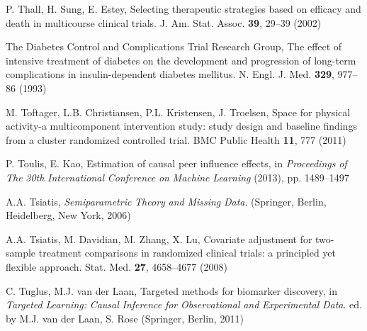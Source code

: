 \begin{list}{}{\setlength{\leftmargin}{2.1em}\setlength{\labelwidth}{0pt}
  \setlength{\labelsep}{0pt}\setlength{\itemindent}{-2.1em}
  \setlength{\parsep}{0pt}\setlength{\itemsep}{2pt}\setlength{\topsep}{0pt}}
\item\label{refentry:REF400}P. Thall, H. Sung, E. Estey, Selecting therapeutic strategies based on efficacy and death in multicourse clinical trials. J. Am. Stat. Assoc. \textbf{39}, 29--39 (2002)\label{refend:REF400}
\item\label{refentry:REF401}The Diabetes Control and Complications Trial Research Group, The effect of intensive treatment of diabetes on the development and progression of long-term complications in insulin-dependent diabetes mellitus. N. Engl. J. Med. \textbf{329}, 977--86 (1993)\label{refend:REF401}
\item\label{refentry:REF402}M. Toftager, L.B. Christiansen, P.L. Kristensen, J. Troelsen, Space for physical activity-a multicomponent intervention study: study design and baseline findings from a cluster randomized controlled trial. BMC Public Health \textbf{11}, 777 (2011)\label{refend:REF402}
\item\label{refentry:REF403}P. Toulis, E. Kao, Estimation of causal peer influence effects, in \textit{Proceedings} \textit{of} \textit{The} \textit{30th} \textit{International} \textit{Conference} \textit{on} \textit{Machine} \textit{Learning} (2013), pp. 1489--1497\label{refend:REF403}
\item\label{refentry:REF404}A.A. Tsiatis, \textit{Semiparametric} \textit{Theory} \textit{and} \textit{Missing} \textit{Data}. (Springer, Berlin, Heidelberg, New York, 2006)\label{refend:REF404}
\item\label{refentry:REF405}A.A. Tsiatis, M. Davidian, M. Zhang, X. Lu, Covariate adjustment for two-sample treatment comparisons in randomized clinical trials: a principled yet flexible approach. Stat. Med. \textbf{27}, 4658--4677 (2008)\label{refend:REF405}
\item\label{refentry:REF406}C. Tuglus, M.J. van der Laan, Targeted methods for biomarker discovery, in \textit{Targeted} \textit{Learning:} \textit{Causal} \textit{Inference} \textit{for} \textit{Observational} \textit{and} \textit{Experimental} \textit{Data}. ed. by M.J. van der Laan, S. Rose (Springer, Berlin, 2011)\label{refend:REF406}

\end{list}
